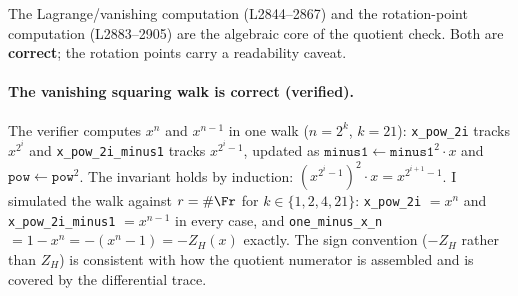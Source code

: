 The Lagrange/vanishing computation (L2844--2867) and the
rotation-point computation (L2883--2905) are the algebraic core
of the quotient check. Both are \textbf{correct}; the rotation
points carry a readability caveat.

\paragraph{The vanishing squaring walk is correct (verified).}
The verifier computes $x^n$ and $x^{n-1}$ in one walk
($n = 2^k$, $k=21$):
\texttt{x\_pow\_2i} tracks $x^{2^i}$ and
\texttt{x\_\allowbreak{}pow\_\allowbreak{}2i\_\allowbreak{}minus1} tracks $x^{2^i-1}$, updated as
$\texttt{minus1} \leftarrow \texttt{minus1}^2 \cdot x$ and
$\texttt{pow} \leftarrow \texttt{pow}^2$. The invariant holds
by induction: $(x^{2^i-1})^2 \cdot x = x^{2^{i+1}-1}$. I
simulated the walk against $r = \#\Fr$ for
$k \in \{1,2,4,21\}$: \texttt{x\_pow\_2i} $= x^n$ and
\texttt{x\_\allowbreak{}pow\_\allowbreak{}2i\_\allowbreak{}minus1} $= x^{n-1}$ in every case, and
\texttt{one\_minus\_x\_n} $= 1 - x^n = -(x^n - 1) = -Z_H(x)$
exactly. The sign convention ($-Z_H$ rather than $Z_H$) is
consistent with how the quotient numerator is assembled and is
covered by the differential trace.

